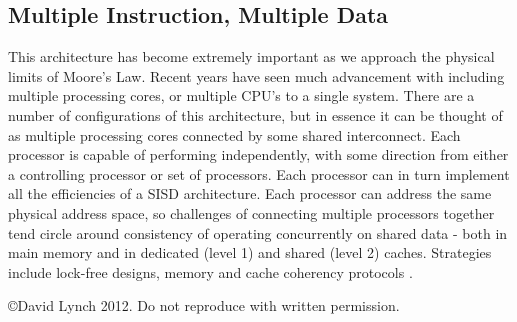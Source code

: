 \documentclass[10pt,a4paper]{article}
\begin{document}
\subsection{Multiple Instruction, Multiple Data}
This architecture has become extremely important as we approach the physical limits of Moore's Law. Recent years have seen much advancement with including multiple processing cores, or multiple CPU's to a single system. There are a number of configurations of this architecture, but in essence it can be thought of as multiple processing cores connected by some shared interconnect. Each processor is capable of performing independently, with some direction from either a controlling processor or set of processors. Each processor can in turn implement all the efficiencies of a SISD architecture. Each processor can address the same physical address space, so challenges of connecting multiple processors together tend circle around  consistency of operating concurrently on shared data - both in main memory and in dedicated (level 1) and shared (level 2) caches. Strategies include lock-free designs, memory \cite{MEMCONSISTENCY} and cache coherency protocols \cite{CACHECOHERENCY}. 



{}

\begin{center}
{\small \copyright  David Lynch 2012. Do not reproduce with written permission.}
\end{center}
\end{document}
